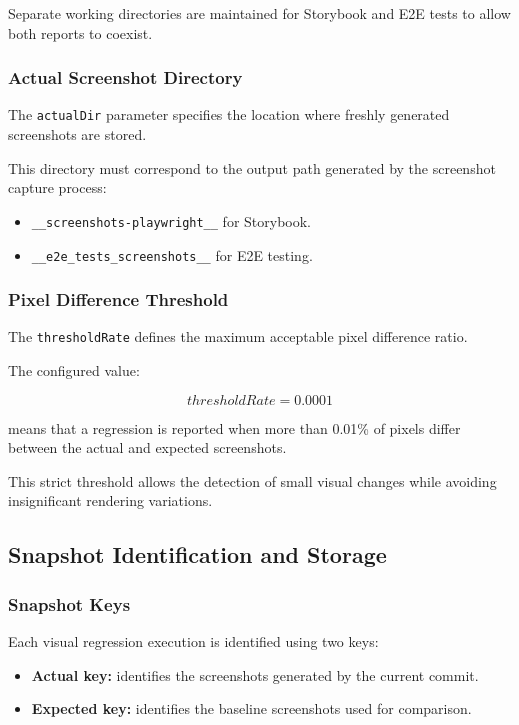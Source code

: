 Separate working directories are maintained for Storybook and E2E tests to allow both reports to coexist.


\subsubsection{Actual Screenshot Directory}

The \texttt{actualDir} parameter specifies the location where freshly generated screenshots are stored.

This directory must correspond to the output path generated by the screenshot capture process:

\begin{itemize}
    \item \texttt{\_\_screenshots-playwright\_\_} for Storybook.
    \item \texttt{\_\_e2e\_tests\_screenshots\_\_} for E2E testing.
\end{itemize}


\subsubsection{Pixel Difference Threshold}

The \texttt{thresholdRate} defines the maximum acceptable pixel difference ratio.

The configured value:

\[
thresholdRate = 0.0001
\]

means that a regression is reported when more than 0.01\% of pixels differ between the actual and expected screenshots.

This strict threshold allows the detection of small visual changes while avoiding insignificant rendering variations.


\subsection{Snapshot Identification and Storage}

\subsubsection{Snapshot Keys}

Each visual regression execution is identified using two keys:

\begin{itemize}
    \item \textbf{Actual key:} identifies the screenshots generated by the current commit.
    \item \textbf{Expected key:} identifies the baseline screenshots used for comparison.
\end{itemize}

